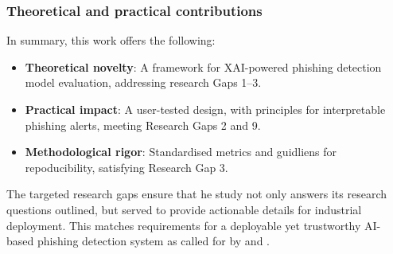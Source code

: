 \subsubsection*{Theoretical and practical contributions}
In summary, this work offers the following:

\begin{itemize}
  \item \textbf{Theoretical novelty}: A framework for XAI-powered phishing detection model evaluation, addressing research Gaps 1--3.
  \item \textbf{Practical impact}: A user-tested design, with principles for interpretable phishing alerts, meeting Research Gaps 2 and 9.
  \item \textbf{Methodological rigor}: Standardised metrics and guidliens for repoducibility, satisfying Research Gap 3.
\end{itemize}

\noindent The targeted research gaps ensure that he study not only answers its research questions outlined, but served to provide actionable details for industrial deployment. This matches requirements for a deployable yet trustworthy AI-based phishing detection system as called for by \cite{atlam2022business} and \cite{lim2025explicate}.

